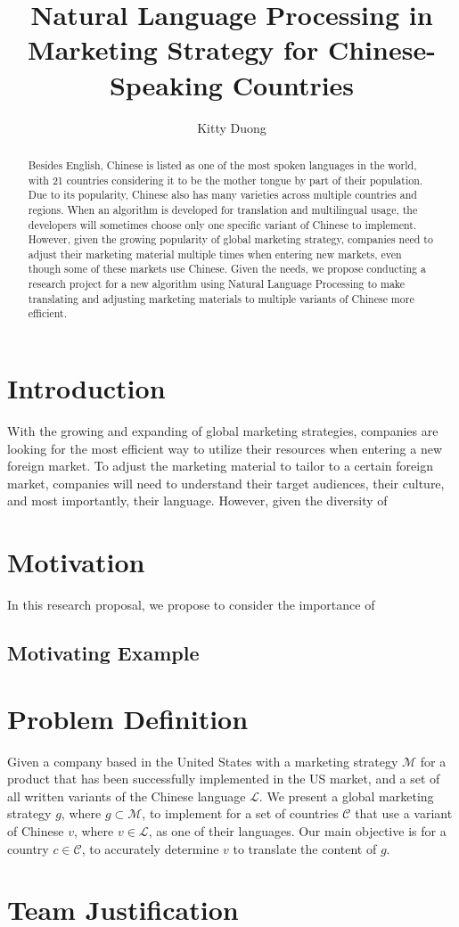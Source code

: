 \documentclass[sigconf]{acmart}
\begin{document}
\title{Natural Language Processing in Marketing Strategy for Chinese-Speaking Countries}
\author{Kitty Duong}

\begin{abstract}
Besides English, Chinese is listed as one of the most spoken languages in the world, with 21 countries considering it to be the mother tongue by part of their population. Due to its popularity, Chinese also has many varieties across multiple countries and regions. When an algorithm is developed for translation and multilingual usage, the developers will sometimes choose only one specific variant of Chinese to implement. However, given the growing popularity of global marketing strategy, companies need to adjust their marketing material multiple times when entering new markets, even though some of these markets use Chinese. Given the needs, we propose conducting a research project for a new algorithm using Natural Language Processing to make translating and adjusting marketing materials to multiple variants of Chinese more efficient.
\end{abstract}

\maketitle

\section{Introduction}
With the growing and expanding of global marketing strategies, companies are looking for the most efficient way to utilize their resources when entering a new foreign market. To adjust the marketing material to tailor to a certain foreign market, companies will need to understand their target audiences, their culture, and most importantly, their language. However, given the diversity of 

\section{Motivation}
In this research proposal, we propose to consider the importance of 
\subsection{Motivating Example}

\section{Problem Definition}
Given a company based in the United States with a marketing strategy $\mathcal{M}$ for a product that has been successfully implemented in the US market, and a set of all written variants of the Chinese language $\mathcal{L}$. We present a global marketing strategy $g$, where $g \subset \mathcal{M}$, to implement for a set of countries $\mathcal{C}$ that use a variant of Chinese $v$, where $v \in \mathcal{L}$, as one of their languages. Our main objective is for a country $c \in \mathcal{C}$, to accurately determine $v$ to translate the content of $g$.
\section{Team Justification} 
\end{document}
